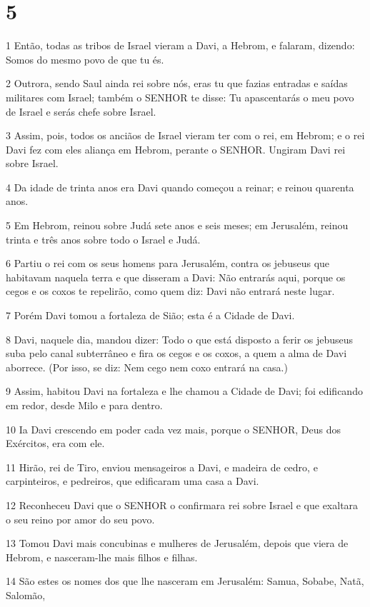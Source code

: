 \chapter{5}

\par 1 Então, todas as tribos de Israel vieram a Davi, a Hebrom, e falaram, dizendo: Somos do mesmo povo de que tu és.
\par 2 Outrora, sendo Saul ainda rei sobre nós, eras tu que fazias entradas e saídas militares com Israel; também o SENHOR te disse: Tu apascentarás o meu povo de Israel e serás chefe sobre Israel.
\par 3 Assim, pois, todos os anciãos de Israel vieram ter com o rei, em Hebrom; e o rei Davi fez com eles aliança em Hebrom, perante o SENHOR. Ungiram Davi rei sobre Israel.
\par 4 Da idade de trinta anos era Davi quando começou a reinar; e reinou quarenta anos.
\par 5 Em Hebrom, reinou sobre Judá sete anos e seis meses; em Jerusalém, reinou trinta e três anos sobre todo o Israel e Judá.
\par 6 Partiu o rei com os seus homens para Jerusalém, contra os jebuseus que habitavam naquela terra e que disseram a Davi: Não entrarás aqui, porque os cegos e os coxos te repelirão, como quem diz: Davi não entrará neste lugar.
\par 7 Porém Davi tomou a fortaleza de Sião; esta é a Cidade de Davi.
\par 8 Davi, naquele dia, mandou dizer: Todo o que está disposto a ferir os jebuseus suba pelo canal subterrâneo e fira os cegos e os coxos, a quem a alma de Davi aborrece. (Por isso, se diz: Nem cego nem coxo entrará na casa.)
\par 9 Assim, habitou Davi na fortaleza e lhe chamou a Cidade de Davi; foi edificando em redor, desde Milo e para dentro.
\par 10 Ia Davi crescendo em poder cada vez mais, porque o SENHOR, Deus dos Exércitos, era com ele.
\par 11 Hirão, rei de Tiro, enviou mensageiros a Davi, e madeira de cedro, e carpinteiros, e pedreiros, que edificaram uma casa a Davi.
\par 12 Reconheceu Davi que o SENHOR o confirmara rei sobre Israel e que exaltara o seu reino por amor do seu povo.
\par 13 Tomou Davi mais concubinas e mulheres de Jerusalém, depois que viera de Hebrom, e nasceram-lhe mais filhos e filhas.
\par 14 São estes os nomes dos que lhe nasceram em Jerusalém: Samua, Sobabe, Natã, Salomão,
